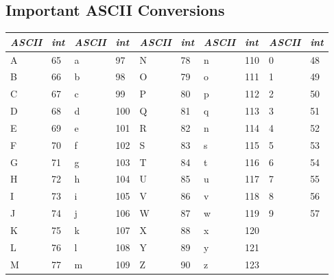 \documentclass[5pt]{article}
\begin{document}
\begin{multicols}{2}
\section{Important ASCII Conversions}
\begin{center}
\begin{tabular}{|ll|ll|ll|ll|ll|}
\hline
\tiny{\emph{ASCII}} &  \emph{int} & \tiny{\emph{ASCII}} &  \emph{int} &  \tiny{\emph{ASCII}} &  \emph{int} &  \tiny{\emph{ASCII}} &  \emph{int}&  \tiny{\emph{ASCII}} &  \emph{int}\\
 \hline
A & 65 & a & 97 & N & 78 & n & 110 & 0 & 48\\
B & 66 & b & 98 & O & 79 & o & 111 & 1 & 49\\
C & 67 & c & 99 & P & 80 & p & 112 & 2 & 50\\
D & 68 & d & 100 & Q & 81 & q & 113 & 3 & 51\\
E & 69 & e & 101 & R & 82 & n & 114 & 4 & 52\\
F & 70 & f & 102 & S & 83 & s & 115 & 5 & 53\\
G & 71 & g & 103 & T & 84 & t & 116 & 6 & 54\\
H & 72 & h & 104 & U & 85 & u & 117 & 7 & 55\\
I & 73 & i & 105 & V & 86 & v & 118 & 8 & 56\\
J & 74 & j & 106 & W & 87 & w & 119 & 9 & 57\\
K & 75 & k & 107 & X & 88 & x & 120 & &\\
L & 76 & l & 108 & Y & 89 & y & 121 & &\\
M & 77 & m & 109 & Z & 90 & z & 123 & &\\
\hline
\end{tabular}
\end{center}

\end{multicols}
\end{document}
